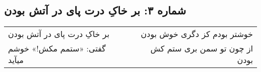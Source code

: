 \begin{center}
\section*{شماره ۳: بر خاکِ درت پای در آتش بودن}
\label{sec:003}
\begin{longtable}{l p{0.5cm} r}
بر خاکِ درت پای در آتش بودن
&&
خوشتر بودم کز دگری خوش بودن
\\
گفتی: «ستمم مکش!» خوشم میآید
&&
از چون تو سمن بری ستم کش بودن
\\
\end{longtable}
\end{center}
